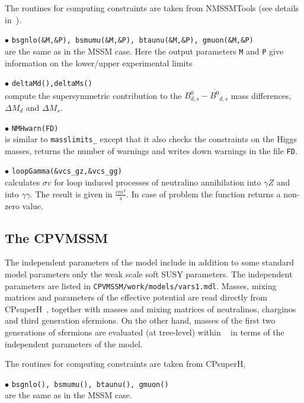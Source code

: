 \documentclass[12pt,a4paper]{article}
\begin{document}
The routines for computing constraints are taken from NMSSMTools (see details  in~\cite{Belanger:2006is}).

\noindent
$\bullet$ {\tt bsgnlo(\&M,\&P), bsmumu(\&M,\&P), btaunu(\&M,\&P),  gmuon(\&M,\&P)}\\ 
are the same as in the MSSM case.  Here the output parameters {\tt M} and {\tt P} 
give information on the lower/upper experimental limits ~\cite{Domingo:2007dx}



\noindent$\bullet$ \verb|deltaMd(),deltaMs()|\\
compute the supersymmetric contribution to the $B^0_{d,s}-\overline{B^0}_{d,s}$ mass differences, $\Delta M_d$ and $\Delta M_s$.

\noindent$\bullet$ \verb|NMHwarn(FD)|\\
is similar to {\tt masslimits\_} except that it also checks the 
constraints on the Higgs masses, returns the number of warnings and 
writes down  warnings in the file \verb|FD|.  

\noi$\bullet$ \verb|loopGamma(&vcs_gz,&vcs_gg)|\\
calculates $\sigma v$ for  loop induced processes of neutralino
annihilation into $\gamma Z$ and into $\gamma \gamma$. The result is given in  
$\frac{cm^3}{s}$. In case of problem the function returns a non-zero value. 


\subsection{The CPVMSSM}

The independent parameters of the model include
in addition to some standard model parameters only the weak scale soft SUSY parameters.
The independent parameters are listed in \verb|CPVMSSM/work/models/vars1.mdl|. 
Masses,
mixing matrices and parameters of the effective potential are read
directly from CPsuperH~\cite{Lee:2003nta,Lee:2007gn}, together with masses and
mixing matrices of neutralinos, charginos and third generation
sfermions.  On the other hand, masses of the first two generations
of sfermions are evaluated (at tree-level) within \micro~ in
terms of the independent parameters of the model.

The routines for computing constraints are taken from CPsuperH,~\cite{CPSUPERH}


\noindent
$\bullet$ {\tt bsgnlo(), bsmumu(), btaunu(), gmuon() }\\  
are the same as in the MSSM case.\\
\end{document}
